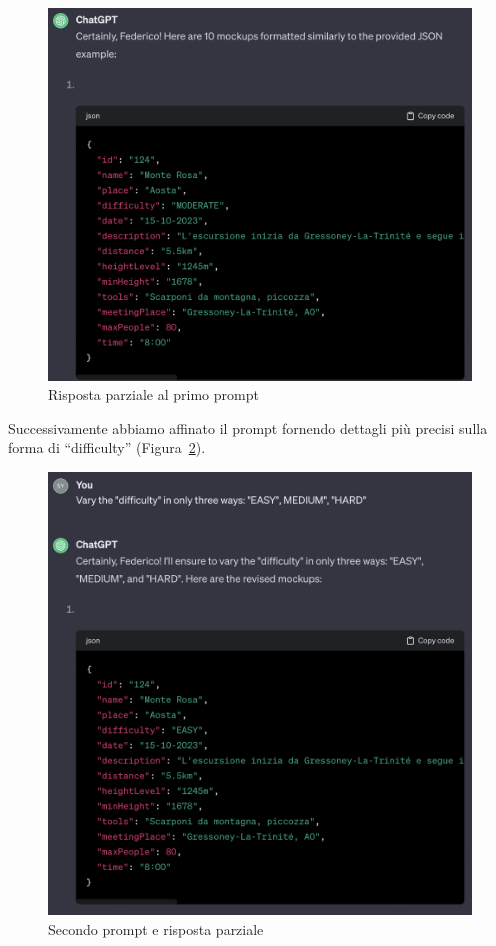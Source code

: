 \begin{figure}[ht]
  \includegraphics[width=\linewidth]{images/prompt2.png}
  \caption{Risposta parziale al primo prompt}\label{fig:prompt2}
\end{figure}
Successivamente abbiamo affinato il prompt fornendo dettagli più precisi sulla forma di ``difficulty'' (Figura~\ref*{fig:prompt3}).
\begin{figure}[ht]
  \includegraphics[width=\linewidth]{images/prompt3.png}
  \caption{Secondo prompt e risposta parziale}\label{fig:prompt3}
\end{figure}
